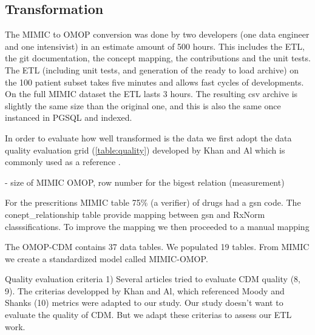 \subsection{Transformation}

The MIMIC to OMOP conversion was done by two developers (one data engineer and
one intensivist) in an estimate amount of 500 hours. This includes the ETL, the
git documentation, the concept mapping, the contributions and the unit tests.
The ETL (including unit tests, and generation of the ready to load archive) on
the 100 patient subset takes five minutes and allows fast cycles of
developments. On the full MIMIC dataset the ETL lasts 3 hours. 
The resulting csv archive is slightly the same size than the original one, and
this is also the same once instanced in PGSQL and indexed.


In order to evaluate how well transformed is the data we first adopt the data
quality evaluation grid (\ref{table:quality}) developed by Khan and Al
\cite{khan-quality} which is commonly used as a reference \cite{moody-quality}.

- size of MIMIC OMOP, row number for the bigest relation (measurement)

  For the prescritions MIMIC table 75\% (a verifier) of drugs had a gsn code. The conept\_relationship table provide mapping between gsn and RxNorm classsifications. To improve the mapping we then proceeded to a manual mapping

The OMOP-CDM contains 37 data tables. We populated 19 tables.
From MIMIC we create a standardized model called MIMIC-OMOP.

Quality evaluation criteria
1)
Several articles tried to evaluate CDM quality (8, 9).
The criterias developped by Khan and Al, which referenced Moody and Shanks (10) metrics were adapted to our study.
Our study doesn't want to evaluate the quality of CDM. But we adapt these criterias to assess our ETL work.


